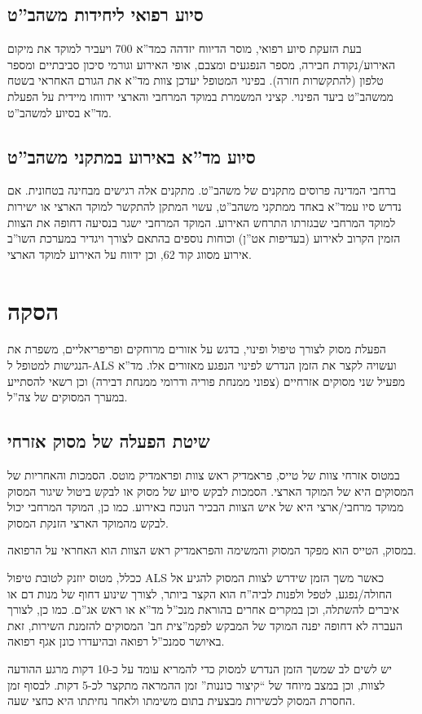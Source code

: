 \documentclass{article}
\begin{document}
\subsection{סיוע רפואי ליחידות משהב''ט}
בעת הזעקת סיוע רפואי, מוסר הדיווח יזדהה כמד''א 700 ויעביר למוקד את מיקום האירוע/נקודת חבירה, מספר הנפגעים ומצבם, אופי האירוע וגורמי סיכון סביבתיים ומספר טלפון (להתקשרות חזרה). בפינוי המטופל יעדכן צוות מד''א את הגורם האחראי בשטח ממשהב''ט ביעד הפינוי. קציני המשמרת במוקד המרחבי והארצי ידווחו מיידית על הפעלת מד''א בסיוע למשהב''ט.
\subsection{סיוע מד''א באירוע במתקני משהב''ט}
ברחבי המדינה פרוסים מתקנים של משהב''ט. מתקנים אלה רגישים מבחינה בטחונית. אם נדרש סיו עמד''א באחד ממתקני משהב''ט, עשוי המתקן להתקשר למוקד הארצי או ישירות למוקד המרחבי שבגזרתו התרחש האירוע. המוקד המרחבי ישגר בנסיעה דחופה את הצוות הזמין הקרוב לאירוע (בעדיפות אט''ן) וכוחות נוספים בהתאם לצורך ויגדיר במערכת השו''ב אירוע מסווג קוד 62, וכן ידווח על האירוע למוקד הארצי.
\section{הסקה}
הפעלת מסוק לצורך טיפול ופינוי, בדגש על אזורים מרוחקים ופריפריאליים, משפרת את הנגישות למטופל ל-ALS ועשויה לקצר את הזמן הנדרש לפינוי הנפגע מאזורים אלו. מד''א מפעיל שני מסוקים אזרחיים (צפוני ממנחת פוריה ודרומי ממנחת דבירה) וכן רשאי להסתייע במערך המסוקים של צה''ל.
\subsection{שיטת הפעלה של מסוק אזרחי}
במטוס אזרחי צוות של טייס, פראמדיק ראש צוות ופראמדיק מוטס.
הסמכות והאחריות של המסוקים היא של המוקד הארצי. הסמכות לבקש סיוע של מסוק או לבקש ביטול שיגור המסוק ממוקד מרחבי/ארצי היא של איש הצוות הבכיר הנוכח באירוע. כמו כן, המוקד המרחבי יכול לבקש מהמוקד הארצי הזנקת המסוק.

במסוק, הטייס הוא מפקד המסוק והמשימה והפראמדיק ראש הצוות הוא האחראי על הרפואה.

ככלל, מטוס יוזנק לטובת טיפול \textenglish{ALS} כאשר משך הזמן שידרש לצוות המסוק להגיע אל החולה/נפגע, לטפל ולפנות לביה''ח הוא הקצר ביותר, לצורך שינוע דחוף של מנות דם או איברים להשתלה, וכן במקרים אחרים בהוראת מנכ''ל מד''א או ראש אג''ם. כמו כן, לצורך העברה לא דחופה יפנה המוקד של המבקש לפקמ''צית חב' המסוקים להזמנת השירות, זאת באיושר סמנכ''ל רפואה ובהיעדרו כונן אגף רפואה.

יש לשים לב שמשך הזמן הנדרש למסוק כדי להמריא עומד על כ-10 דקות מרגע ההודעה לצוות, וכן במצב מיוחד של ``קיצור כוננות'' זמן ההמראה מתקצר לכ-5 דקות. לבסוף זמן החסרת המסוק לכשירות מבצעית בתום משימתו ולאחר נחיתתו היא כחצי שעה.
\end{document}
